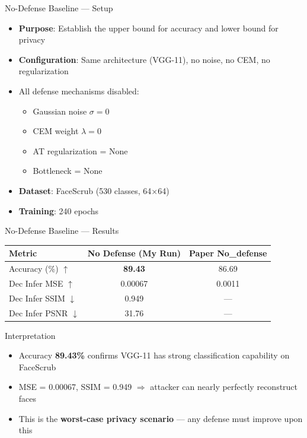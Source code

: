\documentclass[aspectratio=169, 10pt]{beamer}
\newcommand{\bad}[1]{\textcolor{paramred}{#1}}
\begin{document}
\begin{frame}{No-Defense Baseline --- Setup}

\begin{itemize}\setlength{\itemsep}{8pt}
    \item \textbf{Purpose}: Establish the upper bound for accuracy and lower bound for privacy
    \item \textbf{Configuration}: Same architecture (VGG-11), no noise, no CEM, no regularization
    \item All defense mechanisms disabled:
    \begin{itemize}
        \item Gaussian noise $\sigma = 0$
        \item CEM weight $\lambda = 0$
        \item AT regularization = None
        \item Bottleneck = None
    \end{itemize}
    \item \textbf{Dataset}: FaceScrub (530 classes, 64$\times$64)
    \item \textbf{Training}: 240 epochs
\end{itemize}

\end{frame}

\begin{frame}{No-Defense Baseline --- Results}

\begin{center}
\renewcommand{\arraystretch}{1.3}
\begin{tabular}{l c c}
\toprule
\textbf{Metric} & \textbf{No Defense (My Run)} & \textbf{Paper No\_defense} \\
\midrule
Accuracy (\%) $\uparrow$ & \textbf{89.43} & 86.69 \\
\hdashline
Dec Infer MSE $\uparrow$ & 0.00067 & 0.0011 \\
Dec Infer SSIM $\downarrow$ & 0.949 & --- \\
Dec Infer PSNR $\downarrow$ & 31.76 & --- \\
\bottomrule
\end{tabular}
\end{center}

\vspace{0.3cm}

\begin{alertblock}{Interpretation}
\begin{itemize}\small
    \item Accuracy \textbf{89.43\%} confirms VGG-11 has strong classification capability on FaceScrub
    \item MSE = 0.00067, SSIM = 0.949 $\Rightarrow$ attacker can \bad{nearly perfectly reconstruct} faces
    \item This is the \textbf{worst-case privacy scenario} --- any defense must improve upon this
\end{itemize}
\end{alertblock}

\end{frame}
\end{document}
